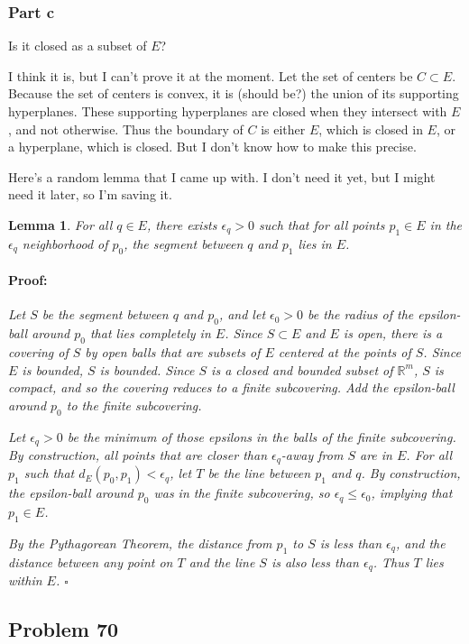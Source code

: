 \documentclass{article}
\newenvironment{proof}{\paragraph{Proof:}}{\hfill$\square$}
\newtheorem{lemma}[theorem]{Lemma}
\newcommand{\R}{\mathbb{R}}
\begin{document}
\subsubsection*{Part c}

Is it closed as a subset of $E$?

I think it is, but I can't prove it at the moment. Let the set of centers be $C \subset E$. Because the set of centers is convex, it is (should be?) the union of its supporting hyperplanes. These supporting hyperplanes are closed when they intersect with $E$, and not otherwise. Thus the boundary of $C$ is either $E$, which is closed in $E$, or a hyperplane, which is closed. But I don't know how to make this precise.

Here's a random lemma that I came up with. I don't need it yet, but I might need it later, so I'm saving it.

\begin{lemma}
For all $q \in E$, there exists $\epsilon_q > 0$ such that for all points $p_1 \in E$ in the $\epsilon_q$ neighborhood of $p_0$, the segment between $q$ and $p_1$ lies in $E$.
\begin{proof}
Let $S$ be the segment between $q$ and $p_0$, and let $\epsilon_0>0$ be the radius of the epsilon-ball around $p_0$ that lies completely in $E$. Since $S \subset E$ and $E$ is open, there is a covering of $S$ by open balls that are subsets of $E$ centered at the points of $S$. Since $E$ is bounded, $S$ is bounded. Since $S$ is a closed and bounded subset of $\R^m$, $S$ is compact, and so the covering reduces to a finite subcovering. Add the epsilon-ball around $p_0$ to the finite subcovering.

Let $\epsilon_q > 0$ be the minimum of those epsilons in the balls of the finite subcovering. By construction, all points that are closer than $\epsilon_q$-away from $S$ are in $E$. For all $p_1$ such that $d_E(p_0, p_1) < \epsilon_q$, let $T$ be the line between $p_1$ and $q$. By construction, the epsilon-ball around $p_0$ was in the finite subcovering, so $\epsilon_q \leq \epsilon_0$, implying that $p_1 \in E$.

By the Pythagorean Theorem, the distance from $p_1$ to $S$ is less than $\epsilon_q$, and the distance between any point on $T$ and the line $S$ is also less than $\epsilon_q$. Thus $T$ lies within $E$.
\end{proof}
\end{lemma}

\subsection*{Problem 70}
\end{document}
